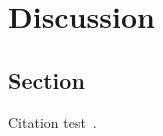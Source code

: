 
\chapter{Discussion}\label{chapter:discussion}

\section{Section}
Citation test~\parencite{latex}.

